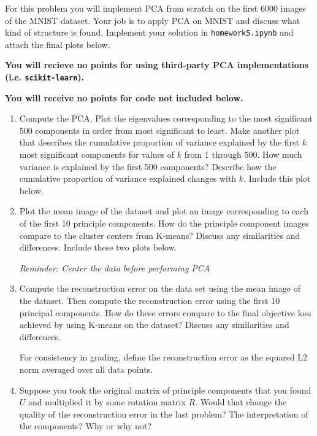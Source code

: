 \documentclass[submit]{harvardml}
\begin{document}
\begin{problem}

  
For this problem you will implement PCA from scratch on the first 6000 images of the MNIST dataset. Your job is to apply PCA on MNIST and discuss what kind of structure is found. Implement your solution in \texttt{homework5.ipynb} and attach the final plots below.

{\bfseries You will recieve no points for using third-party PCA implementations (i.e. {\normalfont \texttt{scikit-learn}}).}

{\bfseries You will receive no points for code not included below.}
\begin{enumerate}

\item Compute the PCA. Plot the eigenvalues corresponding to the most
  significant 500 components in order from most significant to
  least. Make another plot that describes the cumulative proportion of
  variance explained by the first $k$ most significant components for
  values of $k$ from 1 through 500.  How much variance is explained by
  the first 500 components?  Describe how the cumulative proportion of
  variance explained changes with $k$.  Include this plot below.

\item Plot the mean image of the dataset and plot an image
  corresponding to each of the first 10 principle components.  How do
  the principle component images compare to the cluster centers from
  K-means? Discuss any similarities and differences.  Include these
  two plots below.
  
  \textit{Reminder: Center the data before performing PCA}

\item Compute the reconstruction error on the data set using the mean
  image of the dataset.  Then compute the reconstruction error using
  the first 10 principal components.  How do these errors compare to
  the final objective loss achieved by using K-means on the dataset?
  Discuss any similarities and differences.

  For consistency in grading, define the reconstruction error as the squared L2
  norm averaged over all data points.


\item Suppose you took the original matrix of principle components
  that you found $U$ and multiplied it by some rotation matrix $R$.
  Would that change the quality of the reconstruction error in the
  last problem?  The interpretation of the components?  Why or why
  not?


\end{enumerate}
\end{problem}
\end{document}
